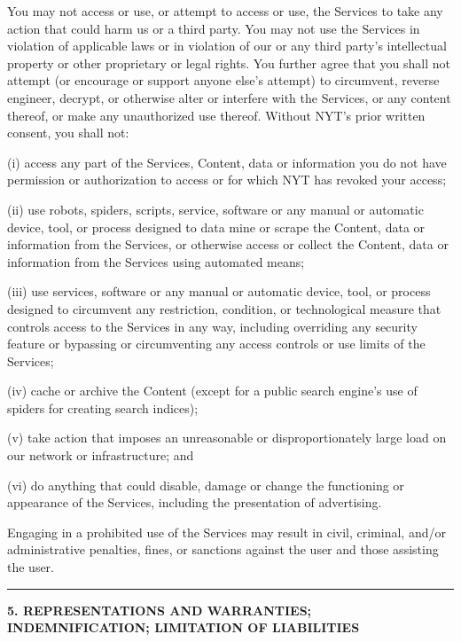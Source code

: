 You may not access or use, or attempt to access or use, the Services to
take any action that could harm us or a third party. You may not use the
Services in violation of applicable laws or in violation of our or any
third party's intellectual property or other proprietary or legal
rights. You further agree that you shall not attempt (or encourage or
support anyone else's attempt) to circumvent, reverse engineer, decrypt,
or otherwise alter or interfere with the Services, or any content
thereof, or make any unauthorized use thereof. Without NYT's prior
written consent, you shall not:

(i) access any part of the Services, Content, data or information you do
not have permission or authorization to access or for which NYT has
revoked your access;

(ii) use robots, spiders, scripts, service, software or any manual or
automatic device, tool, or process designed to data mine or scrape the
Content, data or information from the Services, or otherwise access or
collect the Content, data or information from the Services using
automated means;

(iii) use services, software or any manual or automatic device, tool, or
process designed to circumvent any restriction, condition, or
technological measure that controls access to the Services in any way,
including overriding any security feature or bypassing or circumventing
any access controls or use limits of the Services;

 (iv) cache or archive the Content (except for a public search engine's
use of spiders for creating search indices);

(v) take action that imposes an unreasonable or disproportionately large
load on our network or infrastructure; and

(vi) do anything that could disable, damage or change the functioning or
appearance of the Services, including the presentation of advertising.

Engaging in a prohibited use of the Services may result in civil,
criminal, and/or administrative penalties, fines, or sanctions against
the user and those assisting the user.

\begin{center}\rule{0.5\linewidth}{\linethickness}\end{center}

\textbf{5. REPRESENTATIONS AND WARRANTIES; INDEMNIFICATION; LIMITATION
OF LIABILITIES}

